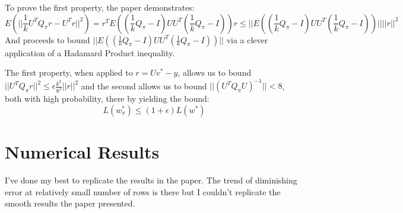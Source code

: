 \documentclass{article}
\begin{document}
        To prove the first property, the paper demonstrates:
        \begin{equation}
            E(||\frac{1}{k}U^TQ_{\pi}r - U^Tr||^2) = r^TE((\frac{1}{k}Q_{\pi}-I)UU^T(\frac{1}{k}Q_{\pi}-I))r \leq ||E((\frac{1}{k}Q_{\pi}-I)UU^T(\frac{1}{k}Q_{\pi}-I))||||r||^2
        \end{equation}
        And proceeds to bound $||E((\frac{1}{k}Q_{\pi}-I)UU^T(\frac{1}{k}Q_{\pi}-I))||$ via a clever application of a Hadamard Product inequality.

        The first property, when applied to $r=Uv^\ast - y$, allows us to bound $||U^TQ_{\pi}r||^2 \leq \epsilon\frac{k^2}{8^2}||r||^2$
        and the second allows us to bound $||(U^TQ_{\pi}U)^{-1}|| < 8$, both with high probability, there by yielding the bound:
        \begin{equation}
            L(w_{\pi}^\ast) \leq (1+\epsilon)L(w^\ast)
        \end{equation}

    \newpage
    \section{Numerical Results}
        I've done my best to replicate the results in the paper.
        The trend of diminishing error at relatively small number of rows is there but I couldn't replicate the smooth results the paper presented.
\end{document}

